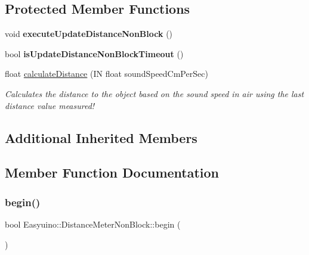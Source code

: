 \subsection*{Protected Member Functions}
\begin{DoxyCompactItemize}
\item 
\mbox{\label{class_easyuino_1_1_distance_meter_non_block_a5410be2725e26c878ebf9bcdf2b79a05}} 
void {\bfseries execute\+Update\+Distance\+Non\+Block} ()
\item 
\mbox{\label{class_easyuino_1_1_distance_meter_non_block_a88f2b7e249345b93a8258ae5c7b75a49}} 
bool {\bfseries is\+Update\+Distance\+Non\+Block\+Timeout} ()
\item 
float \hyperlink{class_easyuino_1_1_distance_meter_non_block_aa51eb173540f65e000189ac7137e699a}{calculate\+Distance} (IN float sound\+Speed\+Cm\+Per\+Sec)
\begin{DoxyCompactList}\small\item\em Calculates the distance to the object based on the sound speed in air using the last distance value measured! \end{DoxyCompactList}\end{DoxyCompactItemize}
\subsection*{Additional Inherited Members}


\subsection{Member Function Documentation}
\mbox{\label{class_easyuino_1_1_distance_meter_non_block_a46d2093d0fc125e98c3602868c088a77}} 
\subsubsection{\texorpdfstring{begin()}{begin()}}
{\footnotesize\ttfamily bool Easyuino\+::\+Distance\+Meter\+Non\+Block\+::begin (\begin{DoxyParamCaption}{ }\end{DoxyParamCaption})\hspace{0.3cm}{\ttfamily [virtual]}}



